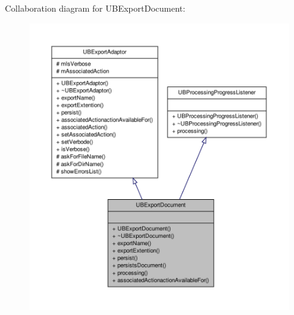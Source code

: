 Collaboration diagram for U\-B\-Export\-Document\-:
\nopagebreak
\begin{figure}[H]
\begin{center}
\leavevmode
\includegraphics[width=350pt]{d9/d1a/class_u_b_export_document__coll__graph}
\end{center}
\end{figure}
